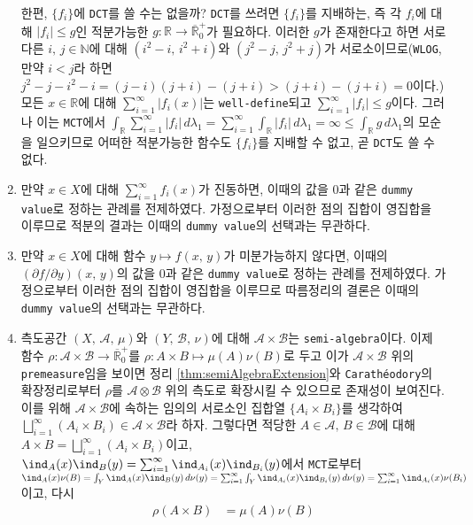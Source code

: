 \begin{enumerate}[label = \textsf{\textbf{\arabic*}}]
    한편, $\{f_i\}$에 \texttt{DCT}를 쓸 수는 없을까? \texttt{DCT}를 쓰려면 $\{f_i\}$를 지배하는, 즉 각 $f_i$에 대해 $|f_i|\leq g$인 적분가능한 $g:\mathbb{R}\to\overline{\mathbb{R}}_0^+$가 필요하다. 이러한 $g$가 존재한다고 하면 서로다른 $i,\,j\in\mathbb{N}$에 대해 $(i^2-i,\,i^2+i)$와 $(j^2-j,\,j^2+j)$가 서로소이므로(\texttt{WLOG}, 만약 $i<j$라 하면 $j^2-j-i^2-i=(j-i)(j+i)-(j+i)>(j+i)-(j+i)=0$이다.) 모든 $x\in\mathbb{R}$에 대해 $\sum_{i=1}^\infty |f_i(x)|$는 \texttt{well-define}되고 $\sum_{i=1}^\infty |f_i|\leq g$이다. 그러나 이는 \texttt{MCT}에서 $\int_\mathbb{R}\sum_{i=1}^\infty |f_i|\,d\lambda_1=\sum_{i=1}^\infty\int_\mathbb{R}|f_i|\,d\lambda_1=\infty\leq\int_\mathbb{R}g\,d\lambda_1$의  모순을 일으키므로 어떠한 적분가능한 함수도 $\{f_i\}$를 지배할 수 없고, 곧 \texttt{DCT}도 쓸 수 없다.
    \item 만약 $x\in X$에 대해 $\sum_{i=1}^\infty f_i(x)$가 진동하면, 이때의 값을 $0$과 같은 \texttt{dummy value}로 정하는 관례를 전제하였다. 가정으로부터 이러한 점의 집합이 영집합을 이루므로 적분의 결과는 이때의 \texttt{dummy value}의 선택과는 무관하다.
    \item 만약 $x\in X$에 대해 함수 $y\mapsto f(x,\,y)$가 미분가능하지 않다면, 이때의 $(\partial f/\partial y)(x,\,y)$의 값을 $0$과 같은 \texttt{dummy value}로 정하는 관례를 전제하였다. 가정으로부터 이러한 점의 집합이 영집합을 이루므로 따름정리의 결론은 이때의 \texttt{dummy value}의 선택과는 무관하다.
    \item 측도공간 $(X,\,\mathcal{A},\,\mu)$와 $(Y,\,\mathcal{B},\,\nu)$에 대해 $\mathcal{A}\times\mathcal{B}$는 \texttt{semi-algebra}이다. 이제 함수 $\rho:\mathcal{A}\times\mathcal{B}\to\overline{\mathbb{R}}^+_0$를 $\rho:A\times B\mapsto\mu(A)\nu(B)$로 두고 이가 $\mathcal{A}\times\mathcal{B}$ 위의 \texttt{premeasure}임을 보이면 정리 \ref{thm:semiAlgebraExtension}와 \texttt{Carath\'eodory}의 확장정리로부터 $\rho$를 $\mathcal{A}\otimes\mathcal{B}$ 위의 측도로 확장시킬 수 있으므로 존재성이 보여진다. 이를 위해 $\mathcal{A}\times\mathcal{B}$에 속하는 임의의 서로소인 집합열 $\{A_i\times B_i\}$를 생각하여 $\bigsqcup_{i=1}^\infty(A_i\times B_i)\in\mathcal{A}\times\mathcal{B}$라 하자. 그렇다면 적당한 $A\in\mathcal{A},\,B\in\mathcal{B}$에 대해 $A\times B=\bigsqcup_{i=1}^\infty(A_i\times B_i)$이고, $\ind_A(x)\ind_B(y)=\sum_{i=1}^\infty\ind_{A_i}(x)\ind_{B_i}(y)$에서 \texttt{MCT}로부터 $\ind_A(x)\nu(B)=\int_Y\ind_A(x)\ind_B(y)\,d\nu(y)=\sum_{i=1}^\infty\int_Y\ind_{A_i}(x)\ind_{B_i}(y)\,d\nu(y)=\sum_{i=1}^\infty\ind_{A_i}(x)\nu(B_i)$이고, 다시
    \begin{align*}
        \rho(A\times B)&=\mu(A)\nu(B)\\

\end{align*}
\end{enumerate}
